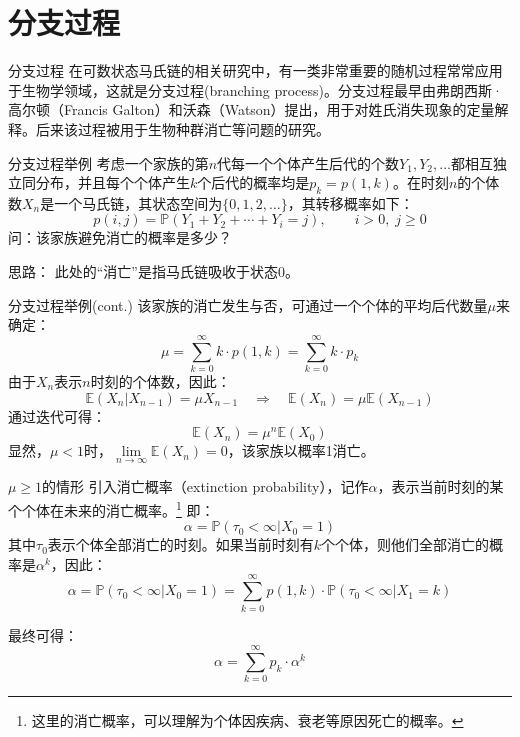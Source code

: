 \documentclass[t]{beamer}
\renewcommand{\Pr}{\mathbb{P}}
\newcommand{\E}{\mathbb{E}}
\begin{document}
\section{分支过程}

\begin{frame}{分支过程}
    在可数状态马氏链的相关研究中，有一类非常重要的随机过程常常应用于生物学领域，这就是分支过程(branching process)。分支过程最早由弗朗西斯·高尔顿（Francis  Galton）和沃森（Watson）提出，用于对姓氏消失现象的定量解释。后来该过程被用于生物种群消亡等问题的研究。
\end{frame}


\begin{frame}{分支过程举例}
    考虑一个家族的第$n$代每一个个体产生后代的个数$Y_1,Y_2,\ldots$都相互独立同分布，并且每个个体产生$k$个后代的概率均是$p_k=p(1,k)$。在时刻$n$的个体数$X_n$是一个马氏链，其状态空间为$\{0,1,2,\ldots\}$，其转移概率如下：
    \[p(i,j)=\Pr(Y_1+Y_2+\cdots+Y_i=j),\qquad i>0,\; j\ge 0 \]
    问：该家族避免消亡的概率是多少？

    \begin{block}{思路：}
        此处的“消亡”是指马氏链吸收于状态0。
    \end{block}
\end{frame}




\begin{frame}{分支过程举例(cont.)}
    该家族的消亡发生与否，可通过一个个体的平均后代数量$\mu$来确定：
    \[\mu=\sum_{k=0}^{\infty}k\cdot p(1,k)=\sum_{k=0}^{\infty}k\cdot p_k \]
    由于$X_n$表示$n$时刻的个体数，因此：
    \[\E(X_n|X_{n-1})=\mu X_{n-1} \quad \Rightarrow\quad \E(X_n)=\mu\E(X_{n-1}) \]
    通过迭代可得：\[\E(X_n)=\mu^{n}\E(X_0) \]
    显然，{$\mu<1$时，$\lim\limits_{n\to\infty}\E(X_n)=0$，该家族以概率1消亡。}
\end{frame}


\begin{frame}{$\mu\ge1$的情形}
    引入消亡概率（extinction probability），记作$\alpha$，表示当前时刻的某个个体在未来的消亡概率。\footnote{这里的消亡概率，可以理解为个体因疾病、衰老等原因死亡的概率。}
    即：$$\alpha=\Pr(\tau_0<\infty|X_0=1)$$
    其中$\tau_0$表示个体全部消亡的时刻。如果当前时刻有$k$个个体，则他们全部消亡的概率是$\alpha^k$，因此：
    \[\alpha=\Pr(\tau_0<\infty|X_0=1)=\sum^{\infty}_{k=0}p(1,k)\cdot {\Pr(\tau_0<\infty|X_1=k)}
    \]

    最终可得：
\begin{equation*}
\alpha=\sum^{\infty}_{k=0}p_k\cdot {\alpha^k} 
\end{equation*}
\end{frame}
\end{document}
